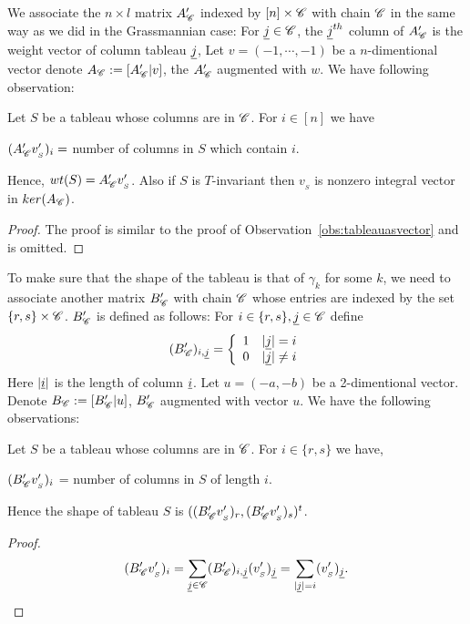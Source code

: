     We associate the \(n \times l\) matrix \(A'_{\mathscr{C}}\) indexed by \([n]\times \mathscr{C}\) with chain \(\mathscr{C}\) in the same way as we did in the Grassmannian case: For \({\underline{j}} \in \mathscr{C}\), the \(\underline{j}^{th}\) column of \(A'_{\mathscr{C}}\) is the weight vector of column tableau \(\underline{j}\), 
Let \(v = (-1,\cdots,-1)\) be a \(n\)-dimentional vector denote \(A_{\mathscr{C}} := [A'_{\mathscr{C}}|v]\), the \(A'_{\mathscr{C}}\) augmented with \(w\). We have following observation:
    \begin{observation}
    \label{obs:B1}
        Let \(S\) be a tableau whose columns are in \(\mathscr{C}\). For \(i \in [n]\) we have
        \begin{center}
        \((A'_{\mathscr{C}}v'_{_S})_{i} = \) number of columns in \(S\) which contain \(i\).
        \end{center}
        Hence, \(wt(S) = A'_{\mathscr{C}}v'_{_S}\). Also if \(S\) is \(T\)-invariant then \(v_{_S}\) is nonzero integral vector in \(ker(A_{\mathscr{C}})\).
    \end{observation}
    \begin{proof}
        The proof is similar to the proof of Observation~\ref{obs:tableauasvector} and is omitted.
    \end{proof}
    To make sure that the shape of the tableau is that of \(\gamma_k\) for some $k$, we need to associate another matrix \(B'_{\mathscr{C}}\) with chain \(\mathscr{C}\) whose entries are indexed by the set \(\{r,s\} \times \mathscr{C}\). \(B'_{\mathscr{C}}\) is defined  as follows: For \(i \in \{r,s\}, \underline{j} \in \mathscr{C}\) define
    \[
        (B'_{\mathscr{C}})_{i,\underline{j}}=
        \left\{\begin{array}{cc}
            1  &  |\underline{j}| = i\\
            0  &  |\underline{j}| \ne i 
        \end{array}\right.
    \]
   Here \(|\underline{i}|\) is the length of column \(\underline{i}\). Let \(u = (-a,-b)\) be a 2-dimentional vector. Denote \(B_{\mathscr{C}} := [B'_{\mathscr{C}} | u]\), \(B'_{\mathscr{C}}\) augmented with vector \(u\). 
    We have the following observations:
    \begin{observation}
        Let \(S\) be a tableau whose columns are in \(\mathscr{C}\). For \(i \in \{r,s\}\) we have,
        \begin{center}
            \((B'_{\mathscr{C}}v'_{_S})_{i}\) = number of columns in \(S\) of length \(i\).
        \end{center}
        Hence the shape of tableau \(S\) is 
        \((({B'_{\mathscr{C}}v'_{_S})_r},({B'_{\mathscr{C}}v'_{_S})_{s}})^t\). 
    \end{observation}
    \begin{proof}
        \[
            (B'_{\mathscr{C}}v'_{_S})_i 
            = \sum_{\underline{j} \in \mathscr{C}} (B'_{\mathscr{C}})_{i,\underline{j}} (v'_{_S})_{\underline{j}}
            = \sum_{|\underline{j}|=i} (v'_{_S})_{\underline{j}}.
        \]
    \end{proof}

